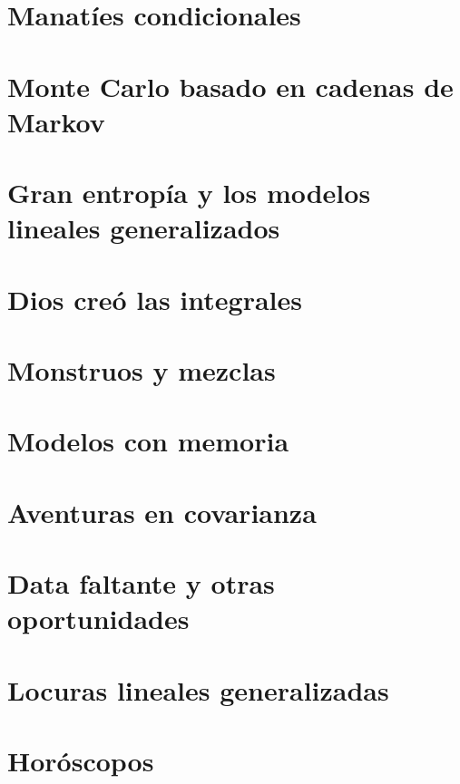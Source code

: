 \documentclass[a4paper,10pt]{book}
\begin{document}
\chapter{Manat\'ies condicionales}



\chapter{Monte Carlo basado en cadenas de Markov}

 

\chapter{Gran entrop\'ia y los modelos lineales generalizados}



\chapter{Dios cre\'o las integrales}



\chapter{Monstruos y mezclas}



\chapter{Modelos con memoria}



\chapter{Aventuras en covarianza}



\chapter{Data faltante y otras oportunidades}



\chapter{Locuras lineales generalizadas}



\chapter{Hor\'oscopos}


\end{document}

